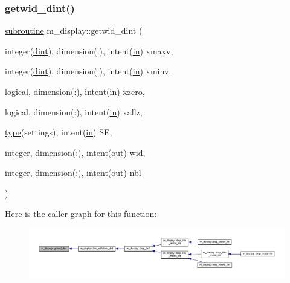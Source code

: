 \subsubsection{\texorpdfstring{getwid\+\_\+dint()}{getwid\_dint()}}
{\footnotesize\ttfamily \hyperlink{M__stopwatch_83_8txt_acfbcff50169d691ff02d4a123ed70482}{subroutine} m\+\_\+display\+::getwid\+\_\+dint (\begin{DoxyParamCaption}\item[{integer(\hyperlink{namespacem__display_a73f772e9702cad6f40b78364fde2c7cd}{dint}), dimension(\+:), intent(\hyperlink{M__journal_83_8txt_afce72651d1eed785a2132bee863b2f38}{in})}]{xmaxv,  }\item[{integer(\hyperlink{namespacem__display_a73f772e9702cad6f40b78364fde2c7cd}{dint}), dimension(\+:), intent(\hyperlink{M__journal_83_8txt_afce72651d1eed785a2132bee863b2f38}{in})}]{xminv,  }\item[{logical, dimension(\+:), intent(\hyperlink{M__journal_83_8txt_afce72651d1eed785a2132bee863b2f38}{in})}]{xzero,  }\item[{logical, dimension(\+:), intent(\hyperlink{M__journal_83_8txt_afce72651d1eed785a2132bee863b2f38}{in})}]{xallz,  }\item[{\hyperlink{stop__watch_83_8txt_a70f0ead91c32e25323c03265aa302c1c}{type}(settings), intent(\hyperlink{M__journal_83_8txt_afce72651d1eed785a2132bee863b2f38}{in})}]{SE,  }\item[{integer, dimension(\+:), intent(out)}]{wid,  }\item[{integer, dimension(\+:), intent(out)}]{nbl }\end{DoxyParamCaption})\hspace{0.3cm}{\ttfamily [private]}}

Here is the caller graph for this function\+:
\nopagebreak
\begin{figure}[H]
\begin{center}
\leavevmode
\includegraphics[width=350pt]{namespacem__display_a6d7287cccf11d65c1821020ef61c7992_icgraph}
\end{center}
\end{figure}
\mbox{\label{namespacem__display_a033e94ba8986246bbf567046e8678163}} 
